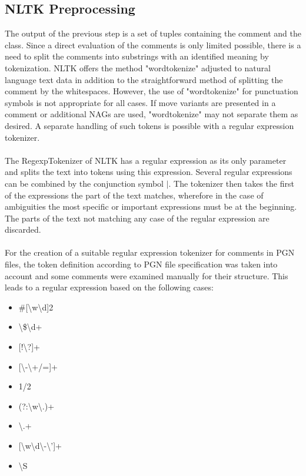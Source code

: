 \documentclass[article,type=msc,colorback,accentcolor=tud7b]{tudthesis}
\begin{document}
  \subsection{NLTK Preprocessing}
  \label{subsec:nltk_preprocessing}    
   The output of the previous step is a set of tuples containing the comment and the class. Since a direct evaluation of the comments is only limited possible, there is a need to split the comments into substrings with an identified meaning by tokenization. NLTK offers the method "word\textunderscore tokenize" adjusted to natural language text data in addition to the straightforward method of splitting the comment by the whitespaces. However, the use of "word\textunderscore tokenize" for punctuation symbols is not appropriate for all cases. If move variants are presented in a comment or additional NAGs are used, "word\textunderscore tokenize" may not separate them as desired. A separate handling of such tokens is possible with a regular expression tokenizer. \\\\
    The RegexpTokenizer of NLTK has a regular expression as its only parameter and splits the text into tokens using this expression. Several regular expressions can be combined by the conjunction symbol $|$. The tokenizer then takes the first of the expressions the part of the text matches, wherefore in the case of ambiguities the most specific or important expressions must be at the beginning. The parts of the text not matching any case of the regular expression are discarded. \\\\
    For the creation of a suitable regular expression tokenizer for comments in PGN files, the token definition according to PGN file specification was taken into account \autocite[Section~7]{Edwards1994} and some comments were examined manually for their structure. This leads to a regular expression based on the following cases:
    \begin{itemize}
      \setlength\itemsep{0.4em}
      \item {} \#[\textbackslash w\textbackslash d]{2}
      \item {} \textbackslash\$\textbackslash d+
      \item {} [!\textbackslash?]+
      \item {} [\textbackslash-\textbackslash+/=]+
      \item {} 1/2
      \item {} (?:\textbackslash w\textbackslash.)+
      \item {} \textbackslash.+
      \item {} [\textbackslash w\textbackslash d\textbackslash-\textbackslash']+
      \item {} \textbackslash S
    \end{itemize}
\end{document}
